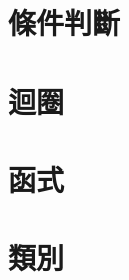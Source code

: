 \documentclass{article}
\begin{document}
\begin{large}
    \section{條件判斷}
    \section{迴圈}
    \section{函式}
    \section{類別}
\end{large}
\end{document}
